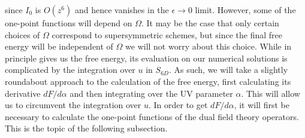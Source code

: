 \documentclass{article}
\begin{document}
since \(I_{0}\) is \(O\left(z^{6}\right)\) and hence vanishes in the \(\epsilon \rightarrow 0\) limit. However, some of the one-point functions will depend on \(\Omega\). It may be the case that only certain choices of \(\Omega\) correspond to supersymmetric schemes, but since the final free energy will be independent of \(\Omega\) we will not worry about this choice. While in principle gives us the free energy, its evaluation on our numerical solutions is complicated by the integration over \(u\) in \(S_{6 D}\). As such, we will take a slightly roundabout approach to the calculation of the free energy, first calculating its derivative \(d F / d \alpha\) and then integrating over the UV parameter \(\alpha\). This will allow us to circumvent the integration over \(u\). In order to get \(d F / d \alpha\), it will first be necessary to calculate the one-point functions of the dual field theory operators. This is the topic of the following subsection.
\end{document}
